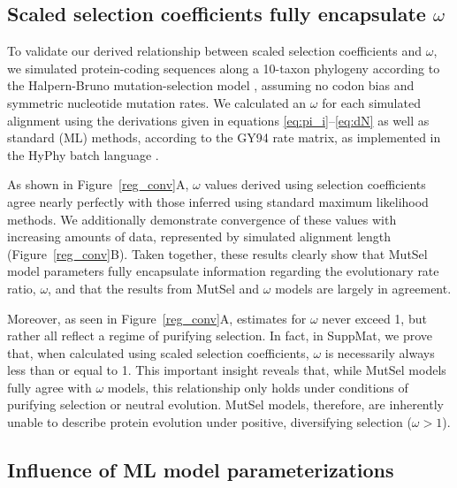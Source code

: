 \documentclass[11pt]{article}
\begin{document}
\subsection*{Scaled selection coefficients fully encapsulate $\omega$}

To validate our derived relationship between scaled selection coefficients and $\omega$, we simulated protein-coding sequences along a 10-taxon phylogeny according to the Halpern-Bruno mutation-selection model \cite{HalpernBruno1998}, assuming no codon bias and symmetric nucleotide mutation rates. We calculated an $\omega$ for each simulated alignment using the derivations given in equations \eqref{eq:pi_i}--\eqref{eq:dN} as well as standard (ML) methods, according to the GY94 \cite{GoldmanYang1994} rate matrix, as implemented in the HyPhy batch language \cite{KosakovskyPondetal2005}.

As shown in Figure~\ref{reg_conv}A, $\omega$ values derived using selection coefficients agree nearly perfectly with those inferred using standard maximum likelihood methods. We additionally demonstrate convergence of these values with increasing amounts of data, represented by simulated alignment length (Figure~\ref{reg_conv}B). Taken together, these results clearly show that MutSel model parameters fully encapsulate information regarding the evolutionary rate ratio, $\omega$, and that the results from MutSel and $\omega$ models are largely in agreement. 

Moreover, as seen in Figure~\ref{reg_conv}A, estimates for $\omega$ never exceed 1, but rather all reflect a regime of purifying selection. In fact, in SuppMat, we prove that, when calculated using scaled selection coefficients, $\omega$ is necessarily always less than or equal to 1. This important insight reveals that, while MutSel models fully agree with $\omega$ models, this relationship only holds under conditions of purifying selection or neutral evolution. MutSel models, therefore, are inherently unable to describe protein evolution under positive, diversifying selection ($\omega > 1$).



\subsection*{Influence of ML model parameterizations}
\end{document}
